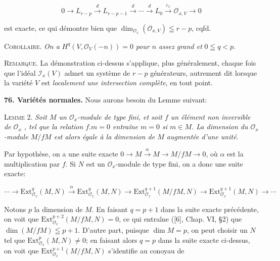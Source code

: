 \begin{equation*}
0 \rightarrow L_{r-p} \overset{d}{\longrightarrow} L_{r-p-1} \overset{d}{\longrightarrow} \cdots \overset{d}{\longrightarrow} L_0 \overset{\varepsilon_x}{\longrightarrow} \mathcal{O}_{x,V} \rightarrow 0
\end{equation*}

est exacte, ce qui démontre bien que $\dim_{\mathcal{O}_x} (\mathcal{O}_{x,V}) \leqq r - p$, cqfd.

\textsc{Corollaire}. \textit{On a} $H^q(V, \mathcal{O}_V(-n)) = 0$ \textit{pour $n$ assez grand et} $0 \leqq q < p$.

\textsc{Remarque}. La démonstration ci-dessus s'applique, plus généralement, chaque fois que l'idéal $\mathcal{I}_x(V)$ admet un système de $r - p$ générateurs, autrement dit lorsque la variété $V$ est \textit{localement une intersection complète}, en tout point.

\textbf{76. Variétés normales.} Nous aurons besoin du Lemme suivant:

\textsc{Lemme} 2. \textit{Soit $M$ un $\mathcal{O}_x$-module de type fini, et soit $f$ un élément non inversible de $\mathcal{O}_x$ , tel que la relation $f.m = 0$ entraîne $m = 0$ si $m \in M$. La dimension du $\mathcal{O}_x$-module $M/fM$ est alors égale à la dimension de $M$ augmentée d'une unité.}

Par hypothèse, on a une suite exacte $0 \rightarrow M \overset{\alpha}{\rightarrow} M \rightarrow M/fM \rightarrow 0$, où $\alpha$ est la multiplication par $f$. Si $N$ est un $\mathcal{O}_x$-module de type fini, on a donc une suite exacte:

\begin{equation*}
\cdots \rightarrow \mathrm{Ext}_{\mathcal{O}_x}^q(M, N) \overset{\alpha}{\longrightarrow} \mathrm{Ext}_{\mathcal{O}_x}^q(M, N) \rightarrow \mathrm{Ext}_{\mathcal{O}_x}^{q+1}(M/fM, N) \rightarrow \mathrm{Ext}_{\mathcal{O}_x}^{q+1}(M, N) \rightarrow \cdots
\end{equation*}

Notons $p$ la dimension de $M$. En faisant $q = p + 1$ dans la suite exacte précédente, on voit que $\mathrm{Ext}_{\mathcal{O}_x}^{p+2}(M/fM, N) = 0$, ce qui entraîne ([6], Chap. VI, \S2) que $\dim (M/fM) \leqq p + 1$. D'autre part, puisque $\dim M = p$, on peut choisir un $N$ tel que $\mathrm{Ext}_{\mathcal{O}_x}^p(M, N) \neq 0$; en faisant alors $q = p$ dans la suite exacte ci-dessus, on voit que $\mathrm{Ext}_{\mathcal{O}_x}^{p+1}(M/fM, N)$ s'identifie au conoyau de

